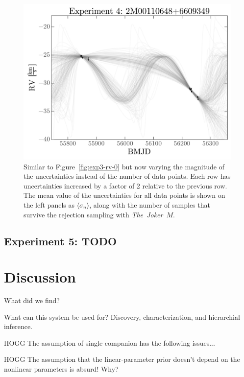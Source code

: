 \documentclass[manuscript, letterpaper]{aastex6}
\newcommand{\project}[1]{\textsl{#1}}
\newcommand{\samplername}{\project{The~Joker}}
\newcommand{\figname}{Figure}
\begin{document}
\begin{figure}[p]
\begin{center}
\includegraphics[width=\textwidth]{figures/exp4-rv-curves.pdf}
\end{center}
\caption{%
Similar to \figname~\ref{fig:exp3-rv-0} but now varying the magnitude of the
uncertainties instead of the number of data points.
Each row has uncertainties increased by a factor of 2 relative to the previous
row.
The mean value of the uncertainties for all data points is shown on the left
panels as $\langle \sigma_n \rangle$, along with the number of samples that
survive the rejection sampling with \samplername\, $M$.
\label{fig:exp4-rv}}
\end{figure}

\subsection{Experiment 5: TODO}


\section{Discussion} \label{sec:discussion}

What did we find?

What can this system be used for? Discovery, characterization, and
hierarchial inference.

HOGG The assumption of single companion has the following issues...

HOGG The assumption that the linear-parameter prior doesn't depend
on the nonlinear parameters is absurd! Why?
\end{document}
